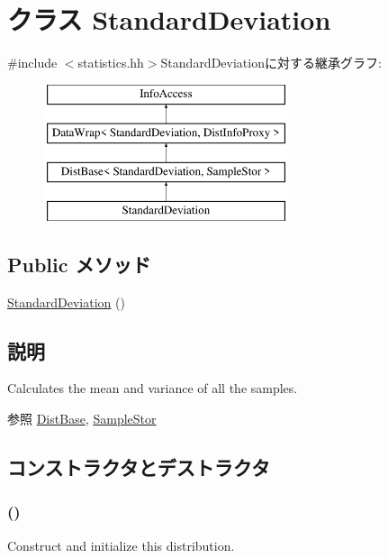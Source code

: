 \hypertarget{classStats_1_1StandardDeviation}{
\section{クラス StandardDeviation}
\label{classStats_1_1StandardDeviation}
}


{\ttfamily \#include $<$statistics.hh$>$}StandardDeviationに対する継承グラフ:\begin{figure}[H]
\begin{center}
\leavevmode
\includegraphics[height=4cm]{classStats_1_1StandardDeviation}
\end{center}
\end{figure}
\subsection*{Public メソッド}
\begin{DoxyCompactItemize}
\item 
\hyperlink{classStats_1_1StandardDeviation_a5138c7330355e1d5fec34c4787fe51fe}{StandardDeviation} ()
\end{DoxyCompactItemize}


\subsection{説明}
Calculates the mean and variance of all the samples. \begin{DoxySeeAlso}{参照}
\hyperlink{classStats_1_1DistBase}{DistBase}, \hyperlink{classStats_1_1SampleStor}{SampleStor} 
\end{DoxySeeAlso}


\subsection{コンストラクタとデストラクタ}
\hypertarget{classStats_1_1StandardDeviation_a5138c7330355e1d5fec34c4787fe51fe}{
\subsubsection[{StandardDeviation}]{ ()}}
\label{classStats_1_1StandardDeviation_a5138c7330355e1d5fec34c4787fe51fe}
Construct and initialize this distribution. 


